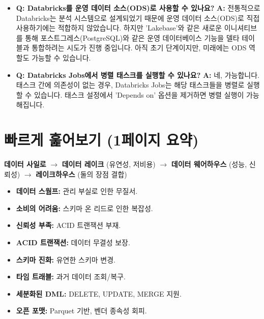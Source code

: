 \documentclass[11pt,a4paper]{article}
\theoremstyle{definition}
\begin{document}
\begin{tcolorbox}[title=\textbf{초심자를 위한 FAQ}, colback=yellow!5!white, colframe=yellow!75!black, sharp corners, boxrule=0.8pt]
\begin{itemize}
    \item \textbf{Q: Databricks를 운영 데이터 소스(ODS)로 사용할 수 있나요?}
    \textbf{A:} 전통적으로 Databricks는 분석 시스템으로 설계되었기 때문에 운영 데이터 소스(ODS)로 직접 사용하기에는 적합하지 않았습니다. 하지만 'Lakebase'와 같은 새로운 이니셔티브를 통해 포스트그레스(PostgreSQL)와 같은 운영 데이터베이스 기능을 델타 테이블과 통합하려는 시도가 진행 중입니다. 아직 초기 단계이지만, 미래에는 ODS 역할도 가능할 수 있습니다.

    \item \textbf{Q: Databricks Jobs에서 병렬 태스크를 실행할 수 있나요?}
    \textbf{A:} 네, 가능합니다. 태스크 간에 의존성이 없는 경우, Databricks Jobs는 해당 태스크들을 병렬로 실행할 수 있습니다. 태스크 설정에서 'Depends on' 옵션을 제거하면 병렬 실행이 가능해집니다.
\end{itemize}
\end{tcolorbox}

\newpage
\section{빠르게 훑어보기 (1페이지 요약)}

\begin{tcolorbox}[title=\textbf{데이터 아키텍처의 진화}, colback=blue!5!white, colframe=blue!75!black, sharp corners, boxrule=0.8pt]
\textbf{데이터 사일로} $\rightarrow$ \textbf{데이터 레이크} (유연성, 저비용) $\rightarrow$ \textbf{데이터 웨어하우스} (성능, 신뢰성) $\rightarrow$ \textbf{레이크하우스} (둘의 장점 결합)
\end{tcolorbox}

\begin{tcolorbox}[title=\textbf{데이터 레이크의 문제점}, colback=red!5!white, colframe=red!75!black, sharp corners, boxrule=0.8pt]
\begin{itemize}
    \item \textbf{데이터 스웜프:} 관리 부실로 인한 무질서.
    \item \textbf{소비의 어려움:} 스키마 온 리드로 인한 복잡성.
    \item \textbf{신뢰성 부족:} ACID 트랜잭션 부재.
\end{itemize}
\end{tcolorbox}

\begin{tcolorbox}[title=\textbf{델타 레이크: 레이크하우스의 핵심}, colback=green!5!white, colframe=green!75!black, sharp corners, boxrule=0.8pt]
\begin{itemize}
    \item \textbf{ACID 트랜잭션:} 데이터 무결성 보장.
    \item \textbf{스키마 진화:} 유연한 스키마 변경.
    \item \textbf{타임 트래블:} 과거 데이터 조회/복구.
    \item \textbf{세분화된 DML:} DELETE, UPDATE, MERGE 지원.
    \item \textbf{오픈 포맷:} Parquet 기반, 벤더 종속성 회피.
\end{itemize}
\end{tcolorbox}
\end{document}
